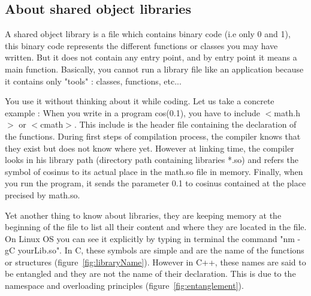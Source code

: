 \documentclass[10pt,a4paper]{report}
\begin{document}
\subsection*{About shared object libraries}
A shared object library is a file which contains binary code (i.e only 0 and 1), this binary code represents the different functions or classes you may have written. But it does not contain any entry point, and by entry point it means a main function. Basically, you cannot run a library file like an application because it contains only "tools" : classes, functions, etc...\par
%
You use it without thinking about it while coding. Let us take a concrete example : When you write in a program cos(0.1), you have to include $<$math.h$>$ or $<$cmath$>$. This include is the header file containing the declaration of the functions. During first steps of compilation process, the compiler knows that they exist but does not know where yet. However at linking time, the compiler looks in his library path (directory path containing libraries *.so) and refers the symbol of cosinus to its actual place in the math.so file in memory. Finally, when you run the program, it sends the parameter 0.1 to cosinus contained at the place precised by math.so.\par
%
Yet another thing to know about libraries, they are keeping memory at the beginning of the file to list all their content and where they are located in the file. On Linux OS you can see it explicitly by typing in terminal the command "nm -gC yourLib.so". In C, these symbols are simple and are the name of the functions or structures (figure~\ref{fig:libraryName}). However in C++, these names are said to be entangled and they are not the name of their declaration. This is due to the namespace and overloading principles (figure~\ref{fig:entanglement}).
%
\end{document}
